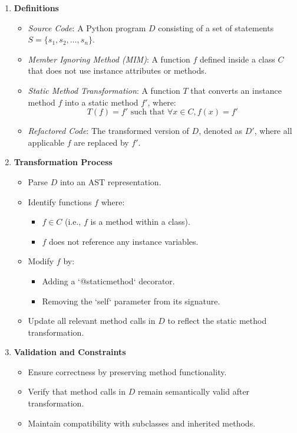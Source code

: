 \documentclass[12pt, titlepage]{article}
\begin{document}
\begin{enumerate}
  \item \textbf{Definitions}
  \begin{itemize}
      \item \textit{Source Code}: A Python program \( D \) consisting of a set of statements \( S = \{ s_1, s_2, \dots, s_n \} \).
      \item \textit{Member Ignoring Method (MIM)}: A function \( f \) defined inside a class \( C \) that does not use instance attributes or methods.
      \item \textit{Static Method Transformation}: A function \( T \) that converts an instance method \( f \) into a static method \( f' \), where:
      \[
      T(f) = f' \text{ such that } \forall x \in C, f(x) = f'
      \]
      \item \textit{Refactored Code}: The transformed version of \( D \), denoted as \( D' \), where all applicable \( f \) are replaced by \( f' \).
  \end{itemize}

  \item \textbf{Transformation Process}
  \begin{itemize}
      \item Parse \( D \) into an AST representation.
      \item Identify functions \( f \) where:
      \begin{itemize}
          \item \( f \in C \) (i.e., \( f \) is a method within a class).
          \item \( f \) does not reference any instance variables.
      \end{itemize}
      \item Modify \( f \) by:
      \begin{itemize}
          \item Adding a `@staticmethod` decorator.
          \item Removing the `self` parameter from its signature.
      \end{itemize}
      \item Update all relevant method calls in \( D \) to reflect the static method transformation.
  \end{itemize}

  \item \textbf{Validation and Constraints}
  \begin{itemize}
      \item Ensure correctness by preserving method functionality.
      \item Verify that method calls in \( D \) remain semantically valid after transformation.
      \item Maintain compatibility with subclasses and inherited methods.
  \end{itemize}
\end{enumerate}
\end{document}
